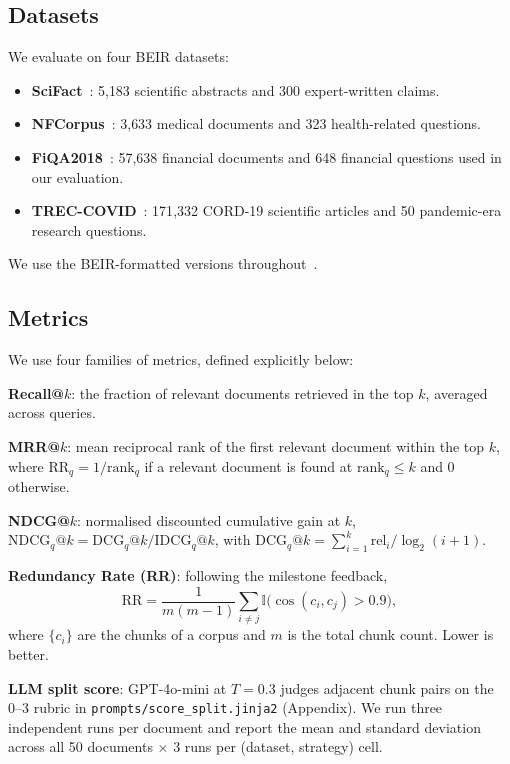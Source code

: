 \documentclass[conference]{IEEEtran}
\begin{document}
\subsection{Datasets}

We evaluate on four BEIR datasets:
\begin{itemize}
    \item \textbf{SciFact}~\cite{wadden2020scifact}: 5{,}183 scientific
    abstracts and 300 expert-written claims.
    \item \textbf{NFCorpus}~\cite{boteva2016nfcorpus}: 3{,}633 medical
    documents and 323 health-related questions.
    \item \textbf{FiQA2018}~\cite{fiqa2018}: 57{,}638 financial documents
    and 648 financial questions used in our evaluation.
    \item \textbf{TREC-COVID}~\cite{roberts2021trec}: 171{,}332 CORD-19
    scientific articles and 50 pandemic-era research questions.
\end{itemize}
We use the BEIR-formatted versions throughout~\cite{thakur2021beir}.

\subsection{Metrics}

We use four families of metrics, defined explicitly below:

\textbf{Recall@$k$}: the fraction of relevant documents retrieved in the top
$k$, averaged across queries.

\textbf{MRR@$k$}: mean reciprocal rank of the first relevant document
within the top $k$, where $\mathrm{RR}_q = 1 / \mathrm{rank}_q$ if a relevant
document is found at $\mathrm{rank}_q \le k$ and 0 otherwise.

\textbf{NDCG@$k$}: normalised discounted cumulative gain at $k$,
$\mathrm{NDCG}_q@k = \mathrm{DCG}_q@k / \mathrm{IDCG}_q@k$, with
$\mathrm{DCG}_q@k = \sum_{i=1}^{k} \mathrm{rel}_i / \log_2(i + 1)$.

\textbf{Redundancy Rate (RR)}: following the milestone feedback,
\begin{equation}
\mathrm{RR} = \frac{1}{m(m-1)} \sum_{i \neq j}
\mathbb{I}\bigl(\cos(c_i, c_j) > 0.9\bigr),
\end{equation}
where $\{c_i\}$ are the chunks of a corpus and $m$ is the total chunk count.
Lower is better.

\textbf{LLM split score}: GPT-4o-mini at $T = 0.3$ judges adjacent chunk
pairs on the 0--3 rubric in
\texttt{prompts/score\_split.jinja2} (Appendix). We run three independent
runs per document and report the mean and standard deviation across all
50 documents $\times$ 3 runs per (dataset, strategy) cell.
\end{document}

